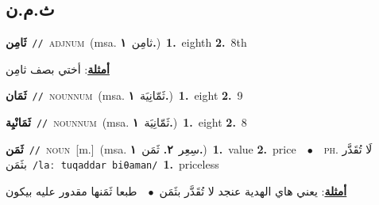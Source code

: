 \documentclass[10pt,a4paper,twoside]{article} %
\begin{document}
\begin{multicols}{2}
\vspace{-3mm}
\subsection*{\color{blue}\foreignlanguage{arabic}{ث.م.ن}\color{blue}{}} 

{\setlength\topsep{0pt}\textbf{\foreignlanguage{arabic}{ثَامِن}}\ {\color{gray}\texttt{//}\color{black}}\ \textsc{adj\textunderscore num}\ \color{gray}(msa. \foreignlanguage{arabic}{ثامِن}~\foreignlanguage{arabic}{\textbf{١.}})\color{black}\ \textbf{1.}~eighth  \textbf{2.}~8th\  \begin{flushright}\color{gray}\foreignlanguage{arabic}{\textbf{\underline{\foreignlanguage{arabic}{أمثلة}}}: أختي بصف ثامِن}\end{flushright}\color{black}} \vspace{2mm}

{\setlength\topsep{0pt}\textbf{\foreignlanguage{arabic}{ثَمَان}}\ {\color{gray}\texttt{//}\color{black}}\ \textsc{noun\textunderscore num}\ \color{gray}(msa. \foreignlanguage{arabic}{ثَمّانِيَة}~\foreignlanguage{arabic}{\textbf{١.}})\color{black}\ \textbf{1.}~eight  \textbf{2.}~9\ } \vspace{2mm}

{\setlength\topsep{0pt}\textbf{\foreignlanguage{arabic}{ثَمَانْيِة}}\ {\color{gray}\texttt{//}\color{black}}\ \textsc{noun\textunderscore num}\ \color{gray}(msa. \foreignlanguage{arabic}{ثَمّانِيَة}~\foreignlanguage{arabic}{\textbf{١.}})\color{black}\ \textbf{1.}~eight  \textbf{2.}~8\ } \vspace{2mm}

{\setlength\topsep{0pt}\textbf{\foreignlanguage{arabic}{ثَمَن}}\ {\color{gray}\texttt{//}\color{black}}\ \textsc{noun}\ [m.]\ \color{gray}(msa. \foreignlanguage{arabic}{سِعِر}~\foreignlanguage{arabic}{\textbf{٢.}}  \foreignlanguage{arabic}{ثَمَن}~\foreignlanguage{arabic}{\textbf{١.}})\color{black}\ \textbf{1.}~value  \textbf{2.}~price\ \ $\bullet$\ \ \textsc{ph.} \color{gray} \foreignlanguage{arabic}{لَا تُقَدَّر بثَمَن}\color{black}\ {\color{gray}\texttt{/{\sffamily laː tuqaddar biθaman}/}\color{black}}\ \textbf{1.}~priceless\  \begin{flushright}\color{gray}\foreignlanguage{arabic}{\textbf{\underline{\foreignlanguage{arabic}{أمثلة}}}: يعني هاي الهدية عنجد لا تُقَدَّر بثَمَن\ $\bullet$\ \  طبعا ثَمَنها مقدور عليه بيكون}\end{flushright}\color{black}} \vspace{2mm}


\end{multicols}
\end{document}
